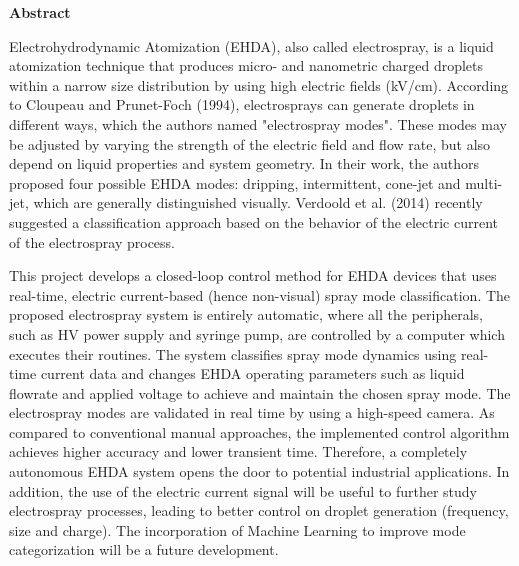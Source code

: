 
\begin{center}
\huge{{\bf Abstract}}
\vspace{2cm}
\end{center}

    Electrohydrodynamic Atomization (EHDA), also called electrospray, is a liquid atomization technique that
    produces micro- and nanometric charged droplets within a narrow size distribution by using high electric fields (kV/cm).
    According to Cloupeau and Prunet-Foch\cite{prunet} (1994), electrosprays can generate droplets in different ways, which the authors
    named "electrospray modes". These modes may be adjusted by varying the strength of the electric field and flow rate,
    but also depend on liquid properties and system geometry. In their work, the authors proposed four possible EHDA
    modes: dripping, intermittent, cone-jet and multi-jet, which are generally distinguished visually. Verdoold et al.\cite{Sjaaks} (2014)
    recently suggested a classification approach based on the behavior of the electric current of the electrospray process.
    
    This project develops a closed-loop control method for EHDA devices that uses real-time, electric current-based (hence
    non-visual) spray mode classification.
    The proposed electrospray system is entirely automatic, where all the peripherals, such as HV power supply and syringe
    pump, are controlled by a computer which executes their routines.
    The system classifies spray mode dynamics using real-time current data and changes EHDA operating parameters such
    as liquid flowrate and applied voltage to achieve and maintain the chosen spray mode. The electrospray modes are
    validated in real time by using a high-speed camera.
    As compared to conventional manual approaches, the implemented control algorithm achieves higher
    accuracy and lower transient time. Therefore, a completely autonomous EHDA system opens the door to potential
    industrial applications. In addition, the use of the electric current signal will be useful to further study electrospray
    processes, leading to better control on droplet generation (frequency, size and charge). The incorporation of Machine
    Learning to improve mode categorization will be a future development.
 

